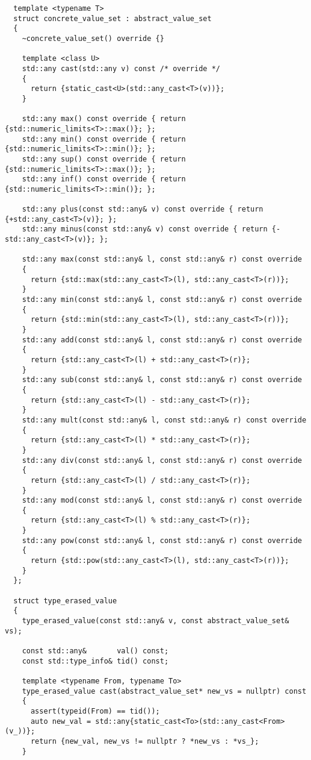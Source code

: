 \begin{verbatim}
  template <typename T>
  struct concrete_value_set : abstract_value_set
  {
    ~concrete_value_set() override {}

    template <class U>
    std::any cast(std::any v) const /* override */
    {
      return {static_cast<U>(std::any_cast<T>(v))};
    }

    std::any max() const override { return {std::numeric_limits<T>::max()}; };
    std::any min() const override { return {std::numeric_limits<T>::min()}; };
    std::any sup() const override { return {std::numeric_limits<T>::max()}; };
    std::any inf() const override { return {std::numeric_limits<T>::min()}; };

    std::any plus(const std::any& v) const override { return {+std::any_cast<T>(v)}; };
    std::any minus(const std::any& v) const override { return {-std::any_cast<T>(v)}; };

    std::any max(const std::any& l, const std::any& r) const override
    {
      return {std::max(std::any_cast<T>(l), std::any_cast<T>(r))};
    }
    std::any min(const std::any& l, const std::any& r) const override
    {
      return {std::min(std::any_cast<T>(l), std::any_cast<T>(r))};
    }
    std::any add(const std::any& l, const std::any& r) const override
    {
      return {std::any_cast<T>(l) + std::any_cast<T>(r)};
    }
    std::any sub(const std::any& l, const std::any& r) const override
    {
      return {std::any_cast<T>(l) - std::any_cast<T>(r)};
    }
    std::any mult(const std::any& l, const std::any& r) const override
    {
      return {std::any_cast<T>(l) * std::any_cast<T>(r)};
    }
    std::any div(const std::any& l, const std::any& r) const override
    {
      return {std::any_cast<T>(l) / std::any_cast<T>(r)};
    }
    std::any mod(const std::any& l, const std::any& r) const override
    {
      return {std::any_cast<T>(l) % std::any_cast<T>(r)};
    }
    std::any pow(const std::any& l, const std::any& r) const override
    {
      return {std::pow(std::any_cast<T>(l), std::any_cast<T>(r))};
    }
  };

  struct type_erased_value
  {
    type_erased_value(const std::any& v, const abstract_value_set& vs);

    const std::any&       val() const;
    const std::type_info& tid() const;

    template <typename From, typename To>
    type_erased_value cast(abstract_value_set* new_vs = nullptr) const
    {
      assert(typeid(From) == tid());
      auto new_val = std::any{static_cast<To>(std::any_cast<From>(v_))};
      return {new_val, new_vs != nullptr ? *new_vs : *vs_};
    }


\end{verbatim}
